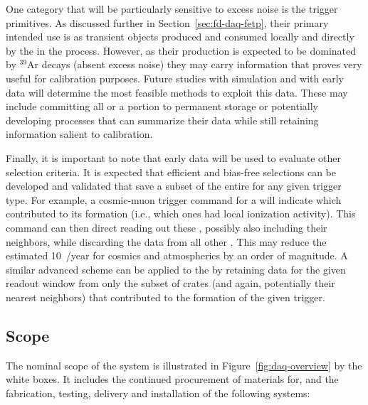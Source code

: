 One category that will be particularly sensitive to excess noise is the trigger primitives. 
As discussed further in Section~\ref{sec:fd-daq-fetp}, their primary
intended use is as transient objects produced and consumed locally
and directly by the  in the  process. 
However, as their production is expected to be dominated by $^{39}$Ar
decays (absent excess noise) they may carry information that proves
very useful for calibration purposes. 
Future studies with simulation and with early data will determine 
 the most feasible methods to exploit this data. 
These may include committing all or a portion to permanent storage or
potentially developing processes that can summarize their data while
still retaining information salient to calibration.

Finally, it is important to note that early data will be used to
evaluate other selection criteria. 
It is expected that efficient and bias-free selections can be
developed and validated that save a subset of the entire
 for any given trigger type. 
For example, a cosmic-muon trigger command for a  will indicate which 
contributed to its formation (i.e., which ones had local ionization activity). 
This command can then direct reading out these , possibly also
including their neighbors, while discarding the data from all other
. 
This may reduce the estimated \SI{10}{\PB/year} for cosmics and
atmospherics by an order of magnitude. 
A similar advanced scheme can be applied to the 
 by retaining data for the given readout window from
only the subset of  crates (and again, potentially their
nearest neighbors) that contributed to the formation of the given
trigger.



\subsection{Scope}
\label{sec:fd-daq-scope}


The nominal scope of the  system is illustrated in
Figure~\ref{fig:daq-overview} by the white boxes. %
It includes the continued procurement of materials for, and the
fabrication, testing, delivery and installation of the following
systems:

